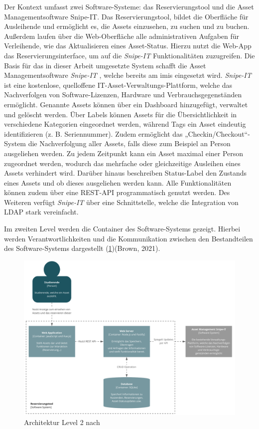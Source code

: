 Der Kontext umfasst zwei Software-Systeme: das Reservierungstool und die Asset Managementsoftware
Snipe-IT. Das Reservierungstool, bildet die Oberfläche für Ausleihende und ermöglicht es, die Assets
einzusehen, zu suchen und zu buchen. Außerdem laufen über die Web-Oberfläche alle administrativen
Aufgaben für Verleihende, wie das Aktualisieren eines Asset-Status. Hierzu nutzt die Web-App das
Reservierungsinterface, um auf die \textit{Snipe-IT} Funktionalitäten zuzugreifen.
Die Basis für das in dieser Arbeit umgesetzte System schafft die Asset Managementsoftware
\textit{Snipe-IT} \cite{noauthor_home_nodate}, welche bereits am \ac{imis} eingesetzt wird.
\textit{Snipe-IT} ist eine kostenlose, quelloffene IT-Asset-Verwaltungs-Plattform, welche das
Nachverfolgen von Software-Lizenzen, Hardware und Verbrauchsgegenständen ermöglicht. Genannte Assets
können über ein Dashboard hinzugefügt, verwaltet und gelöscht werden. Über Labels können Assets für die
Übersichtlichkeit in verschiedene Kategorien eingeordnet werden, während Tags ein Asset eindeutig
identifizieren (z. B. Seriennummer). Zudem ermöglicht das „Checkin/Checkout“-System die
Nachverfolgung aller Assets, falls diese zum Beispiel an Person ausgeliehen werden. Zu jedem
Zeitpunkt kann ein Asset maximal einer Person zugeordnet werden, wodurch das mehrfache oder gleichzeitige
Ausleihen eines Assets verhindert wird. Darüber hinaus beschreiben Status-Label den Zustands eines
Assets und ob dieses ausgeliehen werden kann. Alle Funktionalitäten können zudem über eine REST-API
programmatisch genutzt werden. Des Weiteren verfügt \textit{Snipe-IT} über eine Schnittstelle,
welche die Integration von LDAP stark vereinfacht.

    {\sffamily\color{maincolor}{Level 2: Container}}

Im zweiten Level werden die Container des Software-Systems gezeigt. Hierbei werden Verantwortlichkeiten und
die Kommunikation zwischen den Bestandteilen des Software-Systems dargestellt (\ref{fig:level2})(Brown, 2021).

\begin{figure}[h]
    \centering
    \includegraphics[scale=0.47]{Bilder/level2.pdf}
    \caption[Architektur Level 2]{Architektur Level 2 nach }
    \label{fig:level2}
\end{figure}

